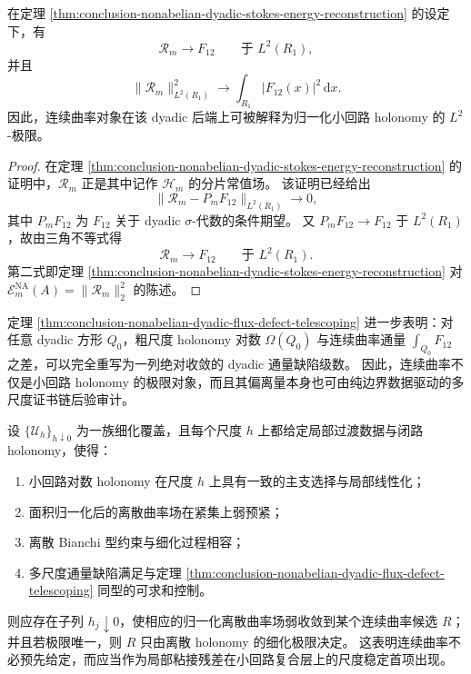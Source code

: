 \begin{corollary}\label{cor:cdim-dyadic-holonomy-curvature-limit}
在定理 \ref{thm:conclusion-nonabelian-dyadic-stokes-energy-reconstruction} 的设定下，有
\[
\mathscr R_m\longrightarrow F_{12}
\qquad\text{于 }L^2(R_1),
\]
并且
\[
\|\mathscr R_m\|_{L^2(R_1)}^2
\longrightarrow
\int_{R_1}|F_{12}(x)|^2\,\mathrm d x.
\]
因此，连续曲率对象在该 dyadic 后端上可被解释为归一化小回路 holonomy 的 \(L^2\)-极限。
\end{corollary}
\begin{proof}
在定理 \ref{thm:conclusion-nonabelian-dyadic-stokes-energy-reconstruction} 的证明中，\(\mathscr R_m\) 正是其中记作 \(\mathscr H_m\) 的分片常值场。
该证明已经给出
\[
\|\mathscr R_m-P_mF_{12}\|_{L^2(R_1)}\longrightarrow 0,
\]
其中 \(P_mF_{12}\) 为 \(F_{12}\) 关于 dyadic \(\sigma\)-代数的条件期望。
又 \(P_mF_{12}\to F_{12}\) 于 \(L^2(R_1)\)，故由三角不等式得
\[
\mathscr R_m\to F_{12}\qquad\text{于 }L^2(R_1).
\]
第二式即定理 \ref{thm:conclusion-nonabelian-dyadic-stokes-energy-reconstruction} 对 \(\mathcal E_m^{\mathrm{NA}}(A)=\|\mathscr R_m\|_2^2\) 的陈述。
\end{proof}


\begin{remark}[通量缺陷给出的后验证书]\label{rem:cdim-dyadic-holonomy-flux-defect-certificate}
定理 \ref{thm:conclusion-nonabelian-dyadic-flux-defect-telescoping} 进一步表明：对任意 dyadic 方形 \(Q_0\)，粗尺度 holonomy 对数 \(\Omega(Q_0)\) 与连续曲率通量 \(\int_{Q_0}F_{12}\) 之差，可以完全重写为一列绝对收敛的 dyadic 通量缺陷级数。
因此，连续曲率不仅是小回路 holonomy 的极限对象，而且其偏离量本身也可由纯边界数据驱动的多尺度证书链后验审计。
\end{remark}

\begin{conjecture}\label{conj:cdim-holonomy-curvature-refinement-limit}
设 \(\{\mathcal U_h\}_{h\downarrow 0}\) 为一族细化覆盖，且每个尺度 \(h\) 上都给定局部过渡数据与闭路 holonomy，使得：
\begin{enumerate}
  \item 小回路对数 holonomy 在尺度 \(h\) 上具有一致的主支选择与局部线性化；
  \item 面积归一化后的离散曲率场在紧集上弱预紧；
  \item 离散 Bianchi 型约束与细化过程相容；
  \item 多尺度通量缺陷满足与定理 \ref{thm:conclusion-nonabelian-dyadic-flux-defect-telescoping} 同型的可求和控制。
\end{enumerate}
则应存在子列 \(h_j\downarrow 0\)，使相应的归一化离散曲率场弱收敛到某个连续曲率候选 \(R\)；并且若极限唯一，则 \(R\) 只由离散 holonomy 的细化极限决定。
这表明连续曲率不必预先给定，而应当作为局部粘接残差在小回路复合层上的尺度稳定首项出现。
\end{conjecture}

